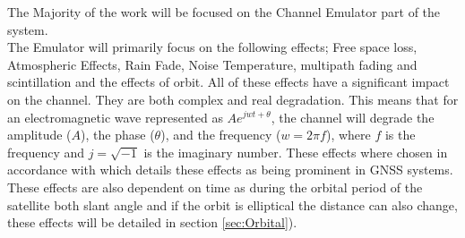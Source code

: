 \documentclass[conference]{IEEEtran}
\begin{document}
The Majority of the work will be focused on the Channel Emulator part of the system.\\

The Emulator will primarily focus on the following effects; Free space loss, Atmospheric Effects, Rain Fade, Noise Temperature, multipath fading and scintillation and the effects of orbit. All of these effects have a significant impact on the channel. They are both complex and real degradation. This means that for an electromagnetic wave represented as $Ae^{j w t+\theta}$, the channel will degrade the amplitude ($A$), the phase ($\theta$), and the frequency ($w = 2\pi f$), where $f$ is the frequency and $j= \sqrt{-1}$ is the imaginary number. These effects where chosen in accordance with \cite{kaplan_understanding_2017} which details these effects as being prominent in GNSS systems.\\

These effects are also dependent on time as during the orbital period of the satellite both slant angle \cite{seybold_introduction_2005} and if the orbit is elliptical \cite{10.5555/2601574} the distance can also change, these effects will be detailed in section \ref{sec:Orbital}).
\label{sec:intro}
\end{document}
